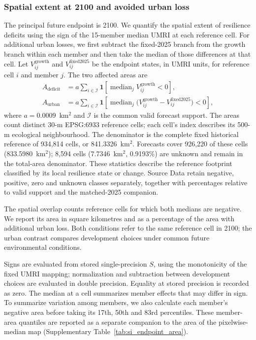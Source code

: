 \subsubsection{Spatial extent at 2100 and avoided urban loss}

The principal future endpoint is 2100. We quantify the spatial extent of resilience deficits using the sign of the 15-member median UMRI at each reference cell. For additional urban losses, we first subtract the fixed-2025 branch from the growth branch within each member and then take the median of those differences at that cell. Let $V_{ij}^{\mathrm{growth}}$ and $V_{ij}^{\mathrm{fixed2025}}$ be the endpoint states, in UMRI units, for reference cell $i$ and member $j$. The two affected areas are
\[
\begin{aligned}
A_{\mathrm{deficit}}&=a\sum_{i\in\mathcal I}\mathbf{1}\!\left[\operatorname{median}_j V_{ij}^{\mathrm{growth}}<0\right],\\
A_{\mathrm{urban}}&=a\sum_{i\in\mathcal I}\mathbf{1}\!\left[\operatorname{median}_j\bigl(V_{ij}^{\mathrm{growth}}-V_{ij}^{\mathrm{fixed2025}}\bigr)<0\right],
\end{aligned}
\]
where $a=0.0009$~km$^2$ and $\mathcal I$ is the common valid forecast support. The areas count distinct 30-m EPSG:6933 reference cells; each cell's index describes its 500-m ecological neighbourhood. The denominator is the complete fixed historical reference of 934,814 cells, or 841.3326~km$^2$. Forecasts cover 926,220 of these cells (833.5980~km$^2$); 8,594 cells (7.7346~km$^2$, 0.9193\%) are unknown and remain in the total-area denominator. These statistics describe the reference footprint classified by its local resilience state or change. Source Data retain negative, positive, zero and unknown classes separately, together with percentages relative to valid support and the matched-2025 companion.

The spatial overlap counts reference cells for which both medians are negative. We report its area in square kilometres and as a percentage of the area with additional urban loss. Both conditions refer to the same reference cell in 2100; the urban contrast compares development choices under common future environmental conditions.

Signs are evaluated from stored single-precision $S$, using the monotonicity of the fixed UMRI mapping; normalization and subtraction between development choices are evaluated in double precision. Equality at stored precision is recorded as zero. The median at a cell summarizes member effects that may differ in sign. To summarize variation among members, we also calculate each member's negative area before taking its 17th, 50th and 83rd percentiles. These member-area quantiles are reported as a separate companion to the area of the pixelwise-median map (Supplementary Table~\ref{tab:si_endpoint_area}).

